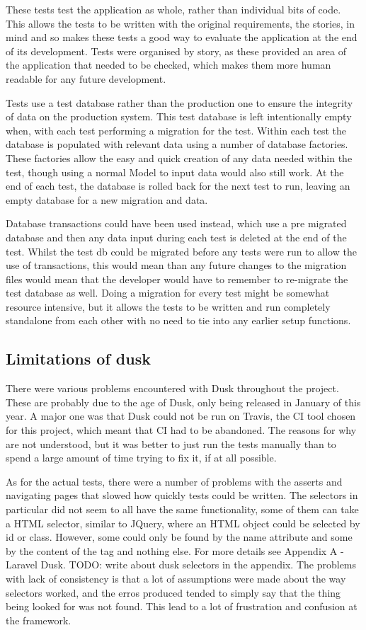 These tests test the application as whole, rather than individual bits of code. This allows the tests to be written with the original requirements, the stories, in mind and so makes these tests a good way to evaluate the application at the end of its development. Tests were organised by story, as these provided an area of the application that needed to be checked, which makes them more human readable for any future development.

Tests use a test database rather than the production one to ensure the integrity of data on the production system. This test database is left intentionally empty when, with each test performing a migration for the test. Within each test the database is populated with relevant data using a number of database factories. These factories allow the easy and quick creation of any data needed within the test, though using a normal Model to input data would also still work. At the end of each test, the database is rolled back for the next test to run, leaving an empty database for a new migration and data.

Database transactions could have been used instead, which use a pre migrated database and then any data input during each test is deleted at the end of the test. Whilst the test db could be migrated before any tests were run to allow the use of transactions, this would mean than any future changes to the migration files would mean that the developer would have to remember to re-migrate the test database as well. Doing a migration for every test might be somewhat resource intensive, but it allows the tests to be written and run completely standalone from each other with no need to tie into any earlier setup functions. 

\subsection{Limitations of dusk}
There were various problems encountered with Dusk throughout the project. These are probably due to the age of Dusk, only being released in January of this year. A major one was that Dusk could not be run on Travis, the CI tool chosen for this project, which meant that CI had to be abandoned. The reasons for why are not understood, but it was better to just run the tests manually than to spend a large amount of time trying to fix it, if at all possible.

As for the actual tests, there were a number of problems with the asserts and navigating pages that slowed how quickly tests could be written. The selectors in particular did not seem to all have the same functionality, some of them can take a HTML selector, similar to JQuery, where an HTML object could be selected by id or class. However, some could only be found by the name attribute and some by the content of the tag and nothing else. For more details see Appendix A - Laravel Dusk. TODO: write about dusk selectors in the appendix. The problems with lack of consistency is that a lot of assumptions were made about the way selectors worked, and the erros produced tended to simply say that the thing being looked for was not found. This lead to a lot of frustration and confusion at the framework. 

